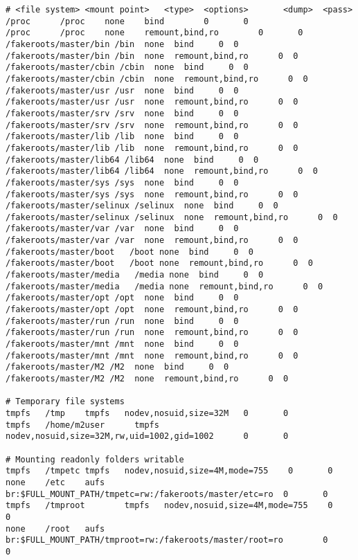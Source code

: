 \documentclass[a4paper]{book}
\begin{document}
\begin{verbatim}
# <file system> <mount point>   <type>  <options>       <dump>  <pass>
/proc      /proc    none    bind        0       0
/proc      /proc    none    remount,bind,ro        0       0
/fakeroots/master/bin /bin  none  bind     0  0
/fakeroots/master/bin /bin  none  remount,bind,ro      0  0
/fakeroots/master/cbin /cbin  none  bind     0  0
/fakeroots/master/cbin /cbin  none  remount,bind,ro      0  0
/fakeroots/master/usr /usr  none  bind     0  0
/fakeroots/master/usr /usr  none  remount,bind,ro      0  0
/fakeroots/master/srv /srv  none  bind     0  0
/fakeroots/master/srv /srv  none  remount,bind,ro      0  0
/fakeroots/master/lib /lib  none  bind     0  0
/fakeroots/master/lib /lib  none  remount,bind,ro      0  0
/fakeroots/master/lib64 /lib64  none  bind     0  0
/fakeroots/master/lib64 /lib64  none  remount,bind,ro      0  0
/fakeroots/master/sys /sys  none  bind     0  0
/fakeroots/master/sys /sys  none  remount,bind,ro      0  0
/fakeroots/master/selinux /selinux  none  bind     0  0
/fakeroots/master/selinux /selinux  none  remount,bind,ro      0  0
/fakeroots/master/var /var  none  bind     0  0
/fakeroots/master/var /var  none  remount,bind,ro      0  0
/fakeroots/master/boot   /boot none  bind     0  0
/fakeroots/master/boot   /boot none  remount,bind,ro      0  0
/fakeroots/master/media   /media none  bind     0  0
/fakeroots/master/media   /media none  remount,bind,ro      0  0
/fakeroots/master/opt /opt  none  bind     0  0
/fakeroots/master/opt /opt  none  remount,bind,ro      0  0
/fakeroots/master/run /run  none  bind     0  0
/fakeroots/master/run /run  none  remount,bind,ro      0  0
/fakeroots/master/mnt /mnt  none  bind     0  0
/fakeroots/master/mnt /mnt  none  remount,bind,ro      0  0
/fakeroots/master/M2 /M2  none  bind     0  0
/fakeroots/master/M2 /M2  none  remount,bind,ro      0  0

# Temporary file systems
tmpfs   /tmp    tmpfs   nodev,nosuid,size=32M   0       0
tmpfs   /home/m2user      tmpfs   nodev,nosuid,size=32M,rw,uid=1002,gid=1002      0       0

# Mounting readonly folders writable
tmpfs   /tmpetc tmpfs   nodev,nosuid,size=4M,mode=755    0       0
none    /etc    aufs    br:$FULL_MOUNT_PATH/tmpetc=rw:/fakeroots/master/etc=ro  0       0
tmpfs   /tmproot        tmpfs   nodev,nosuid,size=4M,mode=755    0       0
none    /root   aufs    br:$FULL_MOUNT_PATH/tmproot=rw:/fakeroots/master/root=ro        0       0
\end{verbatim}
\end{document}
